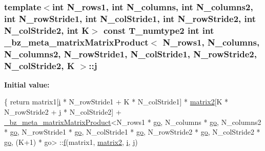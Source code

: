 \subsubsection[{j}]{\setlength{\rightskip}{0pt plus 5cm}template$<$int N\+\_\+rows1, int N\+\_\+columns, int N\+\_\+columns2, int N\+\_\+row\+Stride1, int N\+\_\+col\+Stride1, int N\+\_\+row\+Stride2, int N\+\_\+col\+Stride2, int K$>$ const T\+\_\+numtype2 int int {\bf \+\_\+bz\+\_\+meta\+\_\+matrix\+Matrix\+Product}$<$ N\+\_\+rows1, N\+\_\+columns, N\+\_\+columns2, N\+\_\+row\+Stride1, N\+\_\+col\+Stride1, N\+\_\+row\+Stride2, N\+\_\+col\+Stride2, K $>$\+::j}\label{class__bz__meta__matrixMatrixProduct_a1dcd8bc4716cac12f2579278f88a6ebe}
{\bfseries Initial value\+:}
\begin{DoxyCode}
\{
        \textcolor{keywordflow}{return} matrix1[\hyperlink{class__bz__meta__matrixMatrixProduct_a02729718fa4999d36b6dc932dff9fedc}{i} * N\_rowStride1 + K * N\_colStride1]
            * \hyperlink{class__bz__meta__matrixMatrixProduct_abefcbc18300a7175a21565393c0fbceb}{matrix2}[K * N\_rowStride2 + \hyperlink{class__bz__meta__matrixMatrixProduct_a1dcd8bc4716cac12f2579278f88a6ebe}{j} * N\_colStride2]
            + \hyperlink{class__bz__meta__matrixMatrixProduct}{\_bz\_meta\_matrixMatrixProduct}<N\_rows1 * 
      \hyperlink{class__bz__meta__matrixMatrixProduct_acec73c7d5ead254daf02083688c23398}{go}, N\_columns * \hyperlink{class__bz__meta__matrixMatrixProduct_acec73c7d5ead254daf02083688c23398}{go},
                N\_columns2 * \hyperlink{class__bz__meta__matrixMatrixProduct_acec73c7d5ead254daf02083688c23398}{go}, N\_rowStride1 * \hyperlink{class__bz__meta__matrixMatrixProduct_acec73c7d5ead254daf02083688c23398}{go}, N\_colStride1 * \hyperlink{class__bz__meta__matrixMatrixProduct_acec73c7d5ead254daf02083688c23398}{go},
                N\_rowStride2 * \hyperlink{class__bz__meta__matrixMatrixProduct_acec73c7d5ead254daf02083688c23398}{go}, N\_colStride2 * \hyperlink{class__bz__meta__matrixMatrixProduct_acec73c7d5ead254daf02083688c23398}{go}, (K+1) * go>
              ::\hyperlink{namespacelapack__testing_a1253c46dadde4ab0f214f59fda7810bb}{f}(matrix1, \hyperlink{class__bz__meta__matrixMatrixProduct_abefcbc18300a7175a21565393c0fbceb}{matrix2}, \hyperlink{class__bz__meta__matrixMatrixProduct_a02729718fa4999d36b6dc932dff9fedc}{i}, \hyperlink{class__bz__meta__matrixMatrixProduct_a1dcd8bc4716cac12f2579278f88a6ebe}{j})
\end{DoxyCode}
\hypertarget{class__bz__meta__matrixMatrixProduct_abefcbc18300a7175a21565393c0fbceb}{}
